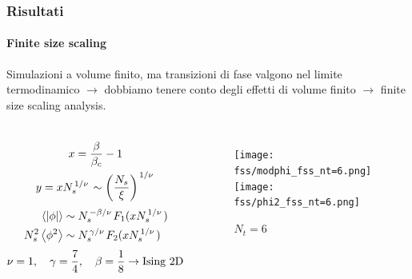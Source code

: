 \documentclass{beamer}
\begin{document}
\begin{frame}
	\frametitle{Risultati}
	\framesubtitle{Finite size scaling}
	
	Simulazioni a volume finito, ma transizioni di fase valgono nel limite termodinamico $\rightarrow$ dobbiamo
	tenere conto degli effetti di volume finito $\rightarrow$ \alert{finite size scaling analysis}.

	\begin{columns}
			\begin{equation*}
				\begin{gathered}
					x = \frac{\beta}{\beta_c} - 1 \\
					y = x N_s^{\flatfrac{1}{\nu}} \sim \qty(\frac{N_s}{\xi})^{\flatfrac{1}{\nu}}
				\end{gathered}
			\end{equation*}
			\begin{equation*}
				\begin{aligned}
					\expval{|\phi|} &\sim N_s^{\flatfrac{-\beta}{\nu}} F_1(x N_s^{\flatfrac{1}{\nu}}) \\
					N_s^2 \expval{\phi^2} &\sim N_s^{\flatfrac{\gamma}{\nu}} F_2(x N_s^{\flatfrac{1}{\nu}})
				\end{aligned}
			\end{equation*}
			\begin{equation*}
				\nu = 1 \qc \gamma = \frac{7}{4} \qc \beta = \frac{1}{8} \rightarrow \text{Ising 2D}
			\end{equation*}
			\begin{figure}[h]
				\centering
				\texttt{[image: fss/modphi\_fss\_nt=6.png]}
				\texttt{[image: fss/phi2\_fss\_nt=6.png]}
				\caption{$N_t = 6$}
			\end{figure}
	\end{columns}
\end{frame}
\end{document}
